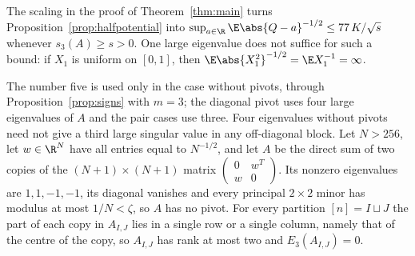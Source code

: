 
\begin{remark}
The scaling in the proof of Theorem~\ref{thm:main} turns Proposition~\ref{prop:halfpotential} into $\sup_{a\in\R}\E\abs{Q-a}^{-1/2}\le77\,K/\sqrt s$ whenever $s_3(A)\ge s>0$. One large eigenvalue does not suffice for such a bound: if $X_1$ is uniform on $[0,1]$, then $\E\abs{X_1^2}^{-1/2}=\E X_1^{-1}=\infty$.
\end{remark}

\begin{remark}
The number five is used only in the case without pivots, through Proposition~\ref{prop:signs} with $m=3$; the diagonal pivot uses four large eigenvalues of $A$ and the pair cases use three. Four eigenvalues without pivots need not give a third large singular value in any off-diagonal block. Let $N>256$, let $w\in\R^N$ have all entries equal to $N^{-1/2}$, and let $A$ be the direct sum of two copies of the $(N+1)\times(N+1)$ matrix $\begin{pmatrix}0&w^T\\w&0\end{pmatrix}$. Its nonzero eigenvalues are $1,1,-1,-1$, its diagonal vanishes and every principal $2\times2$ minor has modulus at most $1/N<\zeta$, so $A$ has no pivot. For every partition $[n]=I\sqcup J$ the part of each copy in $A_{I,J}$ lies in a single row or a single column, namely that of the centre of the copy, so $A_{I,J}$ has rank at most two and $E_3(A_{I,J})=0$.
\end{remark}

